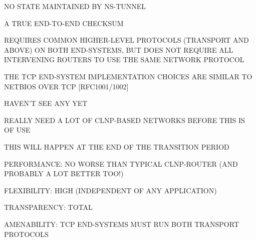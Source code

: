 

\begin{bwslide}

\begin{nrtc}
\item	NO STATE MAINTAINED BY NS-TUNNEL

\item	A TRUE END-TO-END CHECKSUM
\end{nrtc}
\end{bwslide}


\begin{bwslide}

\begin{nrtc}
\item	REQUIRES COMMON HIGHER-LEVEL PROTOCOLS (TRANSPORT AND ABOVE) ON BOTH
	END-SYSTEMS, BUT DOES NOT REQUIRE ALL INTERVENING ROUTERS TO USE THE
	SAME NETWORK PROTOCOL

\item	THE TCP END-SYSTEM IMPLEMENTATION CHOICES ARE SIMILAR TO NETBIOS OVER
	TCP [RFC1001/1002]
\end{nrtc}
\end{bwslide}


\begin{bwslide}

\begin{nrtc}
\item	HAVEN'T SEE ANY YET

\item	REALLY NEED A LOT OF CLNP-BASED NETWORKS BEFORE THIS IS OF USE

\item	THIS WILL HAPPEN AT THE END OF THE TRANSITION PERIOD
\end{nrtc}
\end{bwslide}


\begin{bwslide}

\begin{nrtc}
\item	PERFORMANCE: NO WORSE THAN TYPICAL CLNP-ROUTER (AND PROBABLY A LOT
	BETTER TOO!)

\item	FLEXIBILITY: HIGH (INDEPENDENT OF ANY APPLICATION)

\item	TRANSPARENCY: TOTAL

\item	AMENABILITY: TCP END-SYSTEMS MUST RUN BOTH TRANSPORT PROTOCOLS
\end{nrtc}
\end{bwslide}


